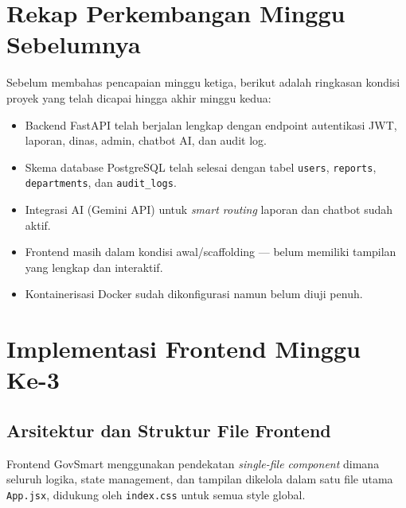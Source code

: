 \documentclass[12pt,a4paper]{article}
\begin{document}
\section{Rekap Perkembangan Minggu Sebelumnya}

Sebelum membahas pencapaian minggu ketiga, berikut adalah ringkasan kondisi proyek
yang telah dicapai hingga akhir minggu kedua:

\begin{infobox}
  \begin{itemize}[leftmargin=1.5em, itemsep=3pt]
    \item Backend FastAPI telah berjalan lengkap dengan endpoint autentikasi JWT,
          laporan, dinas, admin, chatbot AI, dan audit log.
    \item Skema database PostgreSQL telah selesai dengan tabel \texttt{users},
          \texttt{reports}, \texttt{departments}, dan \texttt{audit\_logs}.
    \item Integrasi AI (Gemini API) untuk \textit{smart routing} laporan dan chatbot
          sudah aktif.
    \item Frontend masih dalam kondisi awal/scaffolding --- belum memiliki tampilan
          yang lengkap dan interaktif.
    \item Kontainerisasi Docker sudah dikonfigurasi namun belum diuji penuh.
  \end{itemize}
\end{infobox}

\section{Implementasi Frontend Minggu Ke-3}

\subsection{Arsitektur dan Struktur File Frontend}

Frontend GovSmart menggunakan pendekatan \textit{single-file component} dimana seluruh
logika, state management, dan tampilan dikelola dalam satu file utama \texttt{App.jsx},
didukung oleh \texttt{index.css} untuk semua style global.
\end{document}
